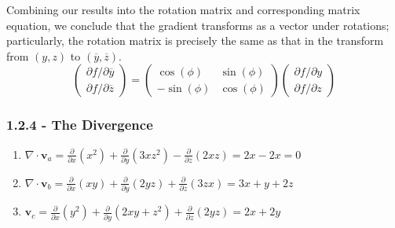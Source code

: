 \documentclass[a4paper]{article}
\begin{document}
Combining our results into the rotation matrix and corresponding matrix equation, we conclude that the gradient transforms as a vector under rotations; particularly, the rotation matrix is precisely the same as that in the transform from \( \!\left( y,z \right) \) to \( \!\left( \overline{y},\overline{z} \right) \).
\[
	\begin{pmatrix}
		\partial f / \partial \overline{y} \\
		\partial f / \partial \overline{z}
	\end{pmatrix}
	=
	\begin{pmatrix}
		\cos\!\left(\phi\right) & \sin\!\left(\phi\right) \\
		-\sin\!\left(\phi\right) & \cos\!\left(\phi\right)
	\end{pmatrix}
	\begin{pmatrix}
		\partial f / \partial y \\
		\partial f / \partial z
	\end{pmatrix}
\]

\subsubsection{\textsf{1.2.4 - The Divergence}}

\begin{enumerate}[label=(\alph*)]
	\item \( \nabla \cdot \pmb{v}_{a} = \frac{\partial }{\partial x}\!\left( x^{2} \right) + \frac{\partial }{\partial y}\!\left( 3xz^{2} \right) - \frac{\partial }{\partial z}\!\left( 2xz \right) = 2x - 2x = 0 \)
	\item \( \nabla \cdot \pmb{v}_{b} = \frac{\partial }{\partial x}\!\left( xy \right) + \frac{\partial }{\partial y}\!\left( 2yz \right) + \frac{\partial }{\partial z}\!\left( 3zx \right) = 3x + y + 2z \)
	\item \( \pmb{v}_{c} = \frac{\partial }{\partial x}\!\left( y^{2} \right) + \frac{\partial }{\partial y}\!\left( 2xy + z^{2} \right) + \frac{\partial }{\partial z}\!\left( 2yz \right) = 2x + 2y \)
\end{enumerate}
\end{document}
